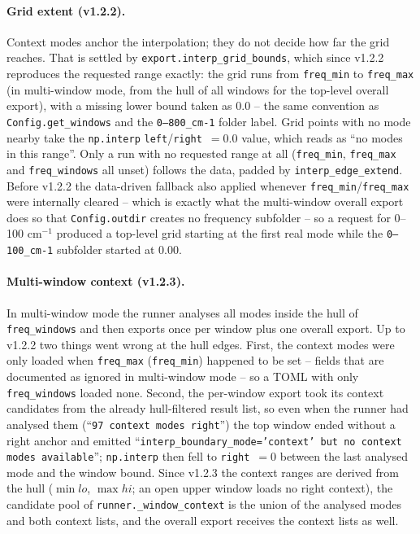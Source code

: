 \documentclass[10pt,a4paper,twoside]{article}
\newcommand{\fn}[1]{\texttt{#1}}
\newcommand{\cfgkey}[1]{\texttt{#1}}
\begin{document}
\paragraph{Grid extent (v1.2.2).}
Context modes anchor the interpolation; they do not decide how far the
grid reaches. That is settled by \fn{export.interp\_grid\_bounds}, which
since v1.2.2 reproduces the requested range exactly: the grid runs from
\cfgkey{freq\_min} to \cfgkey{freq\_max} (in multi-window mode, from the
hull of all windows for the top-level overall export), with a missing
lower bound taken as $0.0$ -- the same convention as
\fn{Config.get\_windows} and the \texttt{0--800\_cm-1} folder label.
Grid points with no mode nearby take the \texttt{np.interp}
\texttt{left}/\texttt{right}~$= 0.0$ value, which reads as ``no modes in
this range''. Only a run with no requested range at all
(\cfgkey{freq\_min}, \cfgkey{freq\_max} and \cfgkey{freq\_windows} all
unset) follows the data, padded by \cfgkey{interp\_edge\_extend}. Before
v1.2.2 the data-driven fallback also applied whenever
\cfgkey{freq\_min}/\cfgkey{freq\_max} were internally cleared -- which is
exactly what the multi-window overall export does so that
\fn{Config.outdir} creates no frequency subfolder -- so a request for
0--100 cm$^{-1}$ produced a top-level grid starting at the first real
mode while the \texttt{0--100\_cm-1} subfolder started at $0.00$.

\paragraph{Multi-window context (v1.2.3).}
In multi-window mode the runner analyses all modes inside the hull of
\cfgkey{freq\_windows} and then exports once per window plus one
overall export. Up to v1.2.2 two things went wrong at the hull edges.
First, the context modes were only loaded when \cfgkey{freq\_max}
(\cfgkey{freq\_min}) happened to be set -- fields that are documented
as ignored in multi-window mode -- so a TOML with only
\cfgkey{freq\_windows} loaded none. Second, the per-window export took
its context candidates from the already hull-filtered result list, so
even when the runner had analysed them (``\texttt{97 context modes
right}'') the top window ended without a right anchor and emitted
``\texttt{interp\_boundary\_mode='context' but no context modes
available}''; \texttt{np.interp} then fell to \texttt{right}~$=0$
between the last analysed mode and the window bound. Since v1.2.3 the
context ranges are derived from the hull ($\min lo$, $\max hi$; an
open upper window loads no right context), the candidate pool of
\fn{runner.\_window\_context} is the union of the analysed modes and
both context lists, and the overall export receives the context lists
as well.
\end{document}
